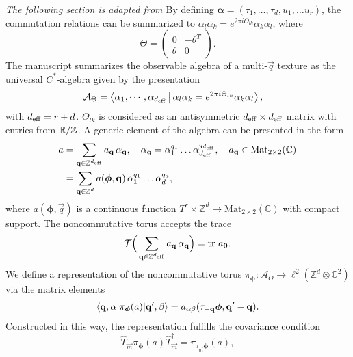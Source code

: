 \documentclass[
    aps,
    prb,
    twocolumn,
    floatfix,
    superscriptaddress,
	10pt
]{revtex4-2}
\begin{document}
{\it The following section is adapted from \cite{Liu2020}}   By defining $\boldsymbol{\alpha}=(\tau_1, \ldots, \tau_d, u_1,\ldots u_r )$, the commutation relations can be summarized to $\alpha_l \alpha_k = e^{2 \pi i \Theta_{lk}} \alpha_k  \alpha_l$, where
\begin{equation}
    \Theta = \begin{pmatrix}
    0 & -\theta^T \\
    \theta & 0
    \end{pmatrix} .
\end{equation}
The manuscript summarizes the observable algebra of a multi-$\vec{q}$ texture as the universal $C^\ast$-algebra given by the presentation
\begin{align}
    \mathcal{A}_\Theta &= \Braket{ \alpha_1, \cdots, \alpha_{{d_\mathrm{eff}}}
    |  \alpha_l \alpha_k = e^{ 2 \pi i \Theta_{lk}} \alpha_k  \alpha_l },
\end{align}
with ${d_\mathrm{eff}} = r+ d$.
$ \Theta_{lk}$ is considered as an antisymmetric  ${d_\mathrm{eff}}\times {d_\mathrm{eff}}$  matrix with entries from ${\mathbb R}/{\mathbb Z}$.
A generic element of the algebra can be presented in the form
\begin{align}
a & = \sum_{\mathbf{q} \in {\mathbb Z}^{{d_\mathrm{eff}}}} a_{\mathbf{q}}
\, \alpha_{\mathbf{q}}, \quad \alpha_{\mathbf{q}} =\alpha_1^{q_1} \ldots\alpha_{d_\mathrm{eff}}^{q_{d_\mathrm{eff}}}, \quad a_{\mathbf{q}} \in \mathrm{Mat}_{2\times2} (\mathbb{C})
\notag \\
& = 	\sum_{\mathbf{q} \in {\mathbb Z}^{d}} a( \boldsymbol{\phi}, \mathbf{q}) 
\, 
\alpha_1^{q_1} \ldots\alpha_d^{q_d},
\end{align}
where $ a(\boldsymbol{\phi},\vec{q}) $  is a continuous function $T^r \times \mathbb{Z}^d \to \mathrm{Mat}_{2\times 2}(\mathbb{C})$ with compact support.
The noncommutative torus accepts the trace
\begin{equation}
	\mathcal{T} \Big(
		\sum_{\mathbf{q} \in {\mathbb Z}^{{d_\mathrm{eff}}}} a_{\mathbf{q}}
\, \alpha_{\mathbf{q}}
	\Big)
	= \mathrm{tr}~ a_{\mathbf{0}} .
\end{equation}
We define a representation of the noncommutative torus $\pi_{\boldsymbol{\phi}} \colon \mathcal{A}_\Theta \to \ell^2(\mathbb{Z}^d \otimes \mathbb{C}^2)$ via the matrix elements
\begin{align}
	\braket{\mathbf{q}, \alpha
	|
	\pi_{\boldsymbol{\phi}} (a)
	| \mathbf{q}', \beta
	}
	=
	a_{\alpha \beta} ( \tau_{-\mathbf{q}} \boldsymbol{\phi}, \mathbf{q}'-\mathbf{q}) .
\end{align}
Constructed in this way, the representation fulfills the covariance condition
\begin{equation}
	\hat{T}_{\vec{m}}
	\pi_{\boldsymbol{\phi}} (a)
	\hat{T}_{\vec{m}}^\dagger
	= \pi_{\tau_{\vec{m}}\boldsymbol{\phi}} (a) ,
\end{equation}
\end{document}

